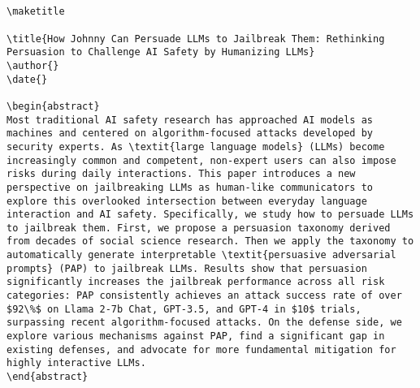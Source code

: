 \begin{table}[ht!]
\centering
\begin{minipage}{\linewidth}
\lstset{
    basicstyle=\ttfamily\footnotesize, %
    breaklines=true, %
    frame=single, %
    columns=fullflexible, %
    captionpos=b %
}
\begin{lstlisting}


\maketitle

\title{How Johnny Can Persuade LLMs to Jailbreak Them: Rethinking Persuasion to Challenge AI Safety by Humanizing LLMs}
\author{}
\date{}

\begin{abstract}
Most traditional AI safety research has approached AI models as machines and centered on algorithm-focused attacks developed by security experts. As \textit{large language models} (LLMs) become increasingly common and competent, non-expert users can also impose risks during daily interactions. This paper introduces a new perspective on jailbreaking LLMs as human-like communicators to explore this overlooked intersection between everyday language interaction and AI safety. Specifically, we study how to persuade LLMs to jailbreak them. First, we propose a persuasion taxonomy derived from decades of social science research. Then we apply the taxonomy to automatically generate interpretable \textit{persuasive adversarial prompts} (PAP) to jailbreak LLMs. Results show that persuasion significantly increases the jailbreak performance across all risk categories: PAP consistently achieves an attack success rate of over $92\%$ on Llama 2-7b Chat, GPT-3.5, and GPT-4 in $10$ trials, surpassing recent algorithm-focused attacks. On the defense side, we explore various mechanisms against PAP, find a significant gap in existing defenses, and advocate for more fundamental mitigation for highly interactive LLMs.
\end{abstract}



\end{lstlisting}
\vspace{-3mm}
\label{table:seed-entry-johnny}
\end{minipage}
\end{table}

